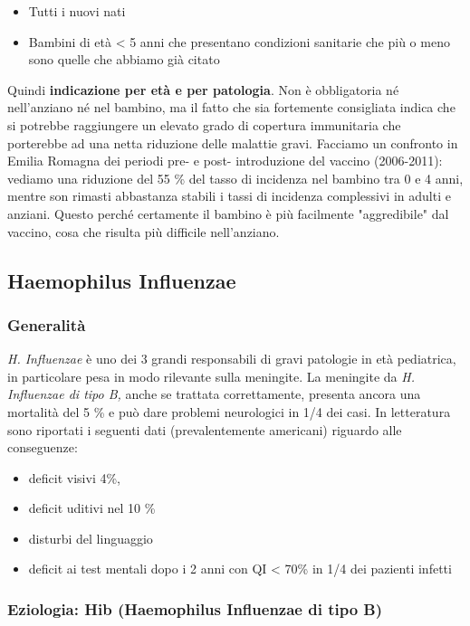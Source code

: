 \begin{itemize}
\item
  Tutti i nuovi nati
\item
  Bambini di età \textless{} 5 anni che presentano condizioni sanitarie
  che più o meno sono quelle che abbiamo già citato
\end{itemize}
  Quindi \textbf{indicazione per età e per patologia}. Non è
  obbligatoria né nell'anziano né nel bambino, ma il fatto che sia
  fortemente consigliata indica che si potrebbe raggiungere un elevato
  grado di copertura immunitaria che porterebbe ad una netta riduzione
  delle malattie gravi. Facciamo un confronto in Emilia Romagna dei
  periodi pre- e post- introduzione del vaccino (2006-2011): vediamo una
  riduzione del 55 \% del tasso di incidenza nel bambino tra 0 e 4 anni,
  mentre son rimasti abbastanza stabili i tassi di incidenza complessivi
  in adulti e anziani. Questo perché certamente il bambino è più
  facilmente "aggredibile" dal vaccino, cosa che risulta più difficile
  nell'anziano.

 \subsection{Haemophilus Influenzae}

\subsubsection{Generalità}

  \emph{H. Influenzae} è uno dei 3 grandi responsabili di gravi
  patologie in età pediatrica, in particolare pesa in modo rilevante
  sulla meningite. La meningite da \emph{H. Influenzae di tipo B,} anche
  se trattata correttamente, presenta ancora una mortalità del 5 \% e
  può dare problemi neurologici in 1/4 dei casi. In letteratura sono
  riportati i seguenti dati (prevalentemente americani) riguardo alle
  conseguenze:
\begin{itemize}
\item deficit visivi 4\%,
\item deficit uditivi nel 10 \%
\item disturbi del linguaggio
\item deficit ai test mentali dopo i 2 anni con QI \textless{} 70\% in 1/4
  dei pazienti infetti
\end{itemize}

\subsubsection{Eziologia: Hib (Haemophilus Influenzae di tipo B)}

